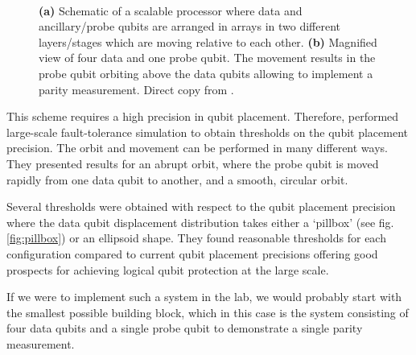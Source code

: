 \begin{figure}[H]
	\centering
	\\
	\caption[paper]{\textbf{(a)} Schematic of a scalable processor where data and ancillary/probe qubits are arranged in arrays in two different layers/stages which are moving relative to each other. \textbf{(b)} Magnified view of four data and one probe qubit. The movement results in the probe qubit orbiting above the data qubits allowing to implement a parity measurement. Direct copy from \cite{OGorman2016}.}
	\label{FIG:paper}
\end{figure}

This scheme requires a high precision in qubit placement. Therefore, \citet{OGorman2016} performed large-scale fault-tolerance simulation to obtain thresholds on the qubit placement precision. The orbit and movement can be performed in many different ways. They presented results for an abrupt orbit, where the probe qubit is moved rapidly from one data qubit to another, and a smooth, circular orbit.

Several thresholds were obtained with respect to the qubit placement precision where the data qubit displacement distribution takes either a `pillbox' (see fig.\@ \ref{fig:pillbox}) or an ellipsoid shape.
They found reasonable thresholds for each configuration compared to current qubit placement precisions offering good prospects for achieving logical qubit protection at the large scale. 

If we were to implement such a system in the lab, we would probably start with the smallest possible building block, which in this case is the system consisting of four data qubits and a single probe qubit to demonstrate a single parity measurement.
